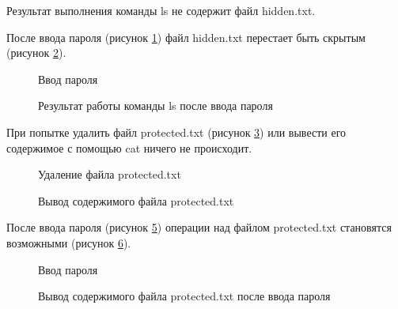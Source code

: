 Результат выполнения команды ls не содержит файл hidden.txt.

После ввода пароля (рисунок \ref{fig:pass1}) файл hidden.txt перестает быть скрытым (рисунок \ref{fig:pass_after1}).

\clearpage

\begin{figure}[ph!]
	\caption{Ввод пароля}
	\label{fig:pass1}
\end{figure}


\begin{figure}[ph!]
	\caption{Результат работы команды ls после ввода пароля}
	\label{fig:pass_after1}
\end{figure}

При попытке удалить файл protected.txt (рисунок \ref{fig:rm}) или вывести его содержимое с помощью cat ничего не происходит.

\begin{figure}[ph!]
	\caption{Удаление файла protected.txt}
	\label{fig:rm}
\end{figure}

\begin{figure}[ph!]
	\caption{Вывод содержимого файла protected.txt}
	\label{fig:cat1}
\end{figure}

После ввода пароля (рисунок \ref{fig:pass2}) операции над файлом protected.txt становятся возможными (рисунок \ref{fig:cat2}).

\begin{figure}[ph!]
	\caption{Ввод пароля}
	\label{fig:pass2}
\end{figure}

\begin{figure}[ph!]
	\caption{Вывод содержимого файла protected.txt после ввода пароля}
	\label{fig:cat2}
\end{figure}


